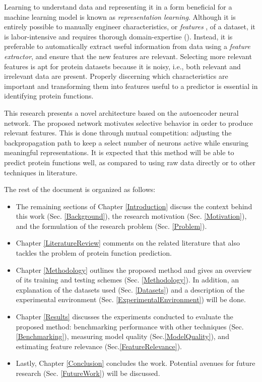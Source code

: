 \par Learning to understand data and representing it in a form beneficial for a
machine learning model is known as \textit{representation learning}. Although
it is entirely possible to manually engineer characteristics, or \textit{features}
, of a dataset, it is labor-intensive and requires thorough domain-expertise 
(\cite{bengio2013representation}).  Instead, it is preferable to automatically
extract useful information from data using a \textit{feature extractor}, and
ensure that the new features are relevant. Selecting more relevant features is
apt for protein datasets because it is noisy, i.e., both relevant and irrelevant
data are present. Properly discerning which characteristics are important and 
transforming them into features useful to a predictor is essential in
identifying protein functions.

\par This research presents a novel architecture based on the autoencoder neural
network. The proposed network motivates selective behavior in order to produce
relevant features. This is done through mutual competition: adjusting the
backpropagation path to keep a select number of neurons active while ensuring
meaningful representations. It is expected that this method will be able to
predict protein functions well, as compared to using raw data directly or to
other techniques in literature. 

\newpage

\par \noindent The rest of the document is organized as follows:

\begin{itemize} 
    \item The remaining sections of Chapter \ref{Introduction}
        discuss the context behind this work (Sec. \ref{Background}), the
        research motivation (Sec. \ref{Motivation}), and the formulation of the
        research problem (Sec. \ref{Problem}).  
    \item Chapter \ref{LiteratureReview} comments on the related literature
        that also tackles the problem of protein function prediction. 
    \item Chapter \ref{Methodology} outlines the proposed method
        and gives an overview of its training and testing schemes (Sec. 
        \ref{Methodology}). In addition, an explanation of the datasets used (Sec.
        \ref{Datasets}) and a description of the experimental environment
        (Sec. \ref{ExperimentalEnvironment}) will be done. 
    \item Chapter \ref{Results} discusses the experiments conducted to evaluate the 
        proposed method: benchmarking performance with other techniques 
        (Sec. \ref{Benchmarking}), measuring model quality (Sec.\ref{ModelQuality}),
        and estimating feature relevance (Sec.\ref{FeatureRelevance}).
    \item Lastly, Chapter \ref{Conclusion} concludes the work. Potential avenues for 
        future research (Sec. \ref{FutureWork}) will be discussed.
\end{itemize}
